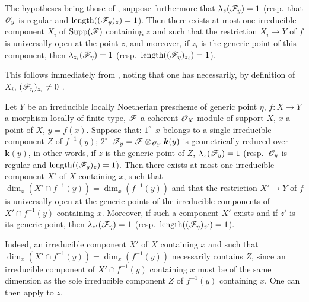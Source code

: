 \begin{corollary}[15.1.2]
\label{IV.15.1.2}
The hypotheses being those of , suppose furthermore that $\lambda_z(\mathscr{F}_y)=1$ \textup{(resp.}~that $\mathscr{O}_y$ is regular and $\operatorname{length}((\mathscr{F}_y)_z)=1$\textup{)}.
Then there exists at most one irreducible component $X_i$ of $\operatorname{Supp}(\mathscr{F})$ containing $z$ and such that the restriction $X_i\to Y$ of $f$ is universally open at the point $z$, and moreover, if $z_i$ is the generic point of this component, then $\lambda_{z_i}(\mathscr{F}_\eta)=1$ \textup{(resp.~$\operatorname{length}((\mathscr{F}_\eta)_{z_i})=1$)}.
\end{corollary}

This follows immediately from , noting that one has necessarily, by definition of $X_i$, $(\mathscr{F}_\eta)_{z_i}\neq 0$ .

\begin{corollary}[15.1.3]
\label{IV.15.1.3}
Let $Y$ be an irreducible locally Noetherian prescheme of generic point $\eta$, $f:X\to Y$ a morphism locally of finite type, $\mathscr{F}$ a coherent $\mathscr{O}_X$-module of support $X$, $x$ a point of $X$, $y=f(x)$.
Suppose that: $1^\circ$~$x$ belongs to a single irreducible component $Z$ of $f^{-1}(y)$; $2^\circ$~$\mathscr{F}_y=\mathscr{F}\otimes_{\mathscr{O}_Y}\boldsymbol{k}(y)$ is geometrically reduced over $\boldsymbol{k}(y)$, in other words, if $z$ is the generic point of $Z$, $\lambda_z(\mathscr{F}_y)=1$ \textup{(resp.}~$\mathscr{O}_y$ is regular and $\operatorname{length}((\mathscr{F}_y)_z)=1$\textup{)}.
Then there exists at most one irreducible component $X'$ of $X$ containing $x$, such that $\dim_x(X'\cap f^{-1}(y))=\dim_x(f^{-1}(y))$ and that the restriction $X'\to Y$ of $f$ is universally open at the generic points of the irreducible components of $X'\cap f^{-1}(y)$ containing $x$.
Moreover, if such a component $X'$ exists and if $z'$ is its generic point, then $\lambda_{z'}(\mathscr{F}_\eta)=1$ \textup{(resp.~$\operatorname{length}((\mathscr{F}_\eta)_{z'})=1$)}.
\end{corollary}

Indeed, an irreducible component $X'$ of $X$ containing $x$ and such that $\dim_x(X'\cap f^{-1}(y))=\dim_x(f^{-1}(y))$ necessarily contains $Z$, since an irreducible component of $X'\cap f^{-1}(y)$ containing $x$ must be of the same dimension as the sole irreducible component $Z$ of $f^{-1}(y)$ containing $x$.
One can then apply  to $z$.

